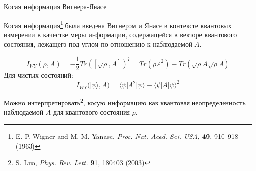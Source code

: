 \begin{frame}{Косая информация Вигнера-Янасе}
  \begin{block}{}
    Косая информация\footnote[frame]{
      E. P. Wigner and M. M. Yanase,
      \textit{Proc. Nat. Acad. Sci. USA},
      \textbf{49}, 910–918 (1963)
    }
    была введена Вигнером и Янасе в контексте квантовых измерении в качестве меры информации,
    содержащейся в векторе квантового состояния, лежащего под углом по отношению к наблюдаемой $A$.
  \end{block}
  $$
    I_{WY}(\rho, A)
    = -\frac{1}{2} Tr([\sqrt{\rho}, A])^2
    = Tr(\rho A^2) - Tr(\sqrt \rho A \sqrt \rho  A )
  $$
  Для чистых состояний:
  $$
    I_{WY}(| \psi \rangle, A)
    = \langle \psi | A^2 | \psi \rangle - \langle \psi | A| \psi \rangle ^2
  $$
  \vspace{-5mm}
  \begin{block}{}
    Можно интерпретировать\footnote[frame]{S. Luo, \textit{Phys. Rev. Lett.} \textbf{91}, 180403 (2003)},
    косую информацию
    как квантовая неопределенность наблюдаемой $A$ для квантового состояния $\rho$.
  \end{block}
\end{frame}
